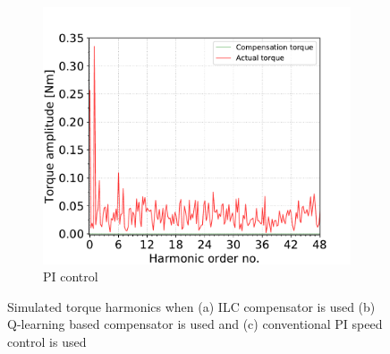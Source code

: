 \begin{figure}[hb]
\begin{subfigure}{\linewidth}
\centering
\includegraphics[width=.5\textwidth]{images/a-sim-ilc-disabled.pdf}
\caption{PI control}
\label{sim:c}
\end{subfigure}
\caption{Simulated torque harmonics when (a) ILC compensator is used (b) Q-learning based compensator is used and (c) conventional PI speed control is used}
\label{sim:torque-ripple}
\end{figure}

\clearpage

